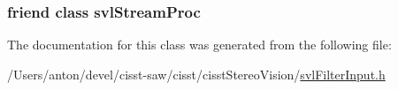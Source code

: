 \subsubsection[{svl\+Stream\+Proc}]{\setlength{\rightskip}{0pt plus 5cm}friend class {\bf svl\+Stream\+Proc}\hspace{0.3cm}{\ttfamily [friend]}}\label{classsvl_filter_input_a6a9ee1dec5ca263793dca09411295245}


The documentation for this class was generated from the following file\+:\begin{DoxyCompactItemize}
\item 
/\+Users/anton/devel/cisst-\/saw/cisst/cisst\+Stereo\+Vision/\hyperlink{svl_filter_input_8h}{svl\+Filter\+Input.\+h}\end{DoxyCompactItemize}
